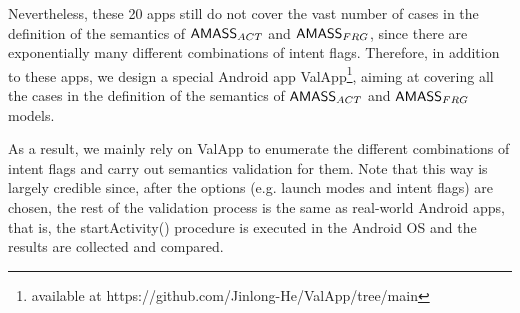 

Nevertheless, these 20 apps still do not cover the vast number of cases in the definition of the semantics of $\textsf{AMASS}_{ACT}$ and $\textsf{AMASS}_{FRG}$, since there are exponentially many different combinations of intent flags. Therefore, in addition to these apps, we design a special Android app ValApp\footnote{available at https://github.com/Jinlong-He/ValApp/tree/main}, aiming at covering all the cases in the definition of the semantics of $\textsf{AMASS}_{ACT}$ and $\textsf{AMASS}_{FRG}$ models. 

As a result, we mainly rely on ValApp to enumerate the different combinations of intent flags and carry out semantics validation for them.  
%
Note that this way %
is largely credible since, after the options (e.g. launch modes and intent flags) are chosen, the rest of the validation process is the same as real-world Android apps, that is, the startActivity() procedure is executed in the Android OS and the results are collected and compared. 


